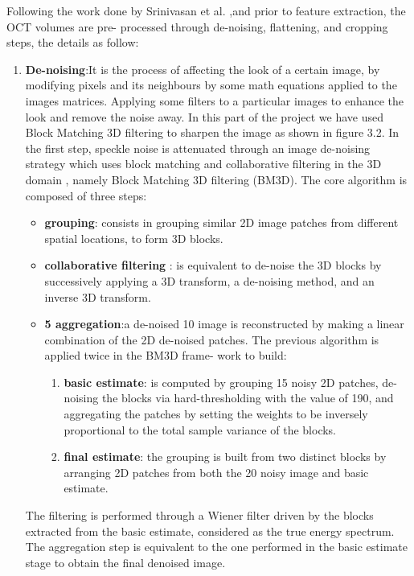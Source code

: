 Following the work done by Srinivasan et al. \cite{srinivasan2014fully},and prior to feature extraction, the OCT volumes are pre- processed through de-noising, flattening, and cropping steps, the details as follow:
\begin{enumerate}
\item \textbf{De-noising}:It is the process of affecting the look of a certain image, by modifying pixels and its neighbours by some math equations applied to the images matrices.
Applying some filters to a particular images to enhance the look and remove the noise away.
In this part of the project we have used Block Matching 3D filtering to sharpen the image as shown in figure 3.2.
In the first step, speckle noise is attenuated through an image de-noising strategy which uses block matching and collaborative filtering in the 3D domain \cite{dabov2007image}, namely Block Matching 3D filtering (BM3D).
The core algorithm is composed of three steps: 
\begin{itemize}
\item \textbf{grouping}: consists in grouping similar 2D image patches from different spatial locations, to form 3D blocks.
\item \textbf{collaborative filtering} : is equivalent to de-noise the 3D blocks by successively applying a 3D transform, a de-noising method, and an inverse 3D transform.
\item \textbf{5 aggregation}:a de-noised 10 image is reconstructed by making a linear combination of the 2D de-noised patches. The previous algorithm is applied twice in the BM3D frame- work to build:
\begin{enumerate}
\item \textbf{basic estimate}: is computed by grouping 15 noisy 2D patches, de-noising the blocks via hard-thresholding with the value of 190, and aggregating the patches by setting the weights to be inversely proportional to the total sample variance of the blocks.
\item \textbf{final estimate}: the grouping is built from two distinct blocks by arranging 2D patches from both the
20 noisy image and basic estimate.
\end{enumerate}  
\end{itemize} 
The filtering is performed through a Wiener filter driven by the blocks extracted from the basic estimate, considered as the true energy spectrum.
The aggregation step is equivalent to the one performed in the basic estimate stage to obtain the final denoised image.


\end{enumerate}
